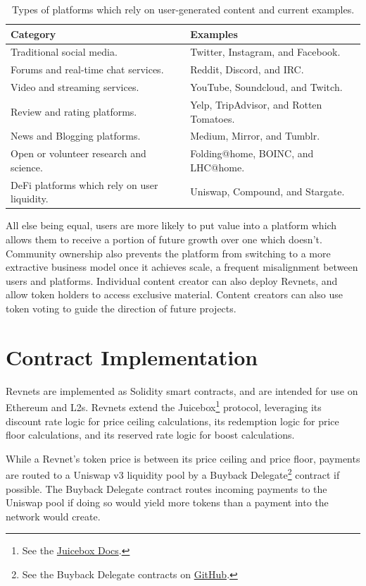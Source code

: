 \documentclass{article}
\begin{document}
\begin{table}[h]
  \centering
  \begin{tabular}{|l|l|}
    \hline \textbf{Category} & \textbf{Examples} \\
    \hline Traditional social media. & Twitter, Instagram, and Facebook. \\
    \hline Forums and real-time chat services. & Reddit, Discord, and IRC. \\
    \hline Video and streaming services. & YouTube, Soundcloud, and Twitch. \\
    \hline Review and rating platforms. & Yelp, TripAdvisor, and Rotten Tomatoes. \\
    \hline News and Blogging platforms. & Medium, Mirror, and Tumblr. \\
    \hline Open or volunteer research and science. & Folding@home, BOINC, and LHC@home. \\
    \hline DeFi platforms which rely on user liquidity. & Uniswap, Compound, and Stargate. \\
    \hline
  \end{tabular}
  \caption{Types of platforms which rely on user-generated content and current examples.}
\end{table}

All else being equal, users are more likely to put value into a platform which allows them to receive a portion of future growth over one which doesn't. Community ownership also prevents the platform from switching to a more extractive business model once it achieves scale, a frequent misalignment between users and platforms. Individual content creator can also deploy Revnets, and allow token holders to access exclusive material. Content creators can also use token voting to guide the direction of future projects.

\section{Contract Implementation}

Revnets are implemented as Solidity smart contracts, and are intended for use on Ethereum and L2s. Revnets extend the Juicebox\footnote{See the \href{https://docs.juicebox.money}{Juicebox Docs}.} protocol, leveraging its discount rate logic for price ceiling calculations, its redemption logic for price floor calculations, and its reserved rate logic for boost calculations.

While a Revnet's token price is between its price ceiling and price floor, payments are routed to a Uniswap v3 liquidity pool by a Buyback Delegate\footnote{See the Buyback Delegate contracts on \href{https://github.com/jbx-protocol/juice-buyback}{GitHub}.} contract if possible. The Buyback Delegate contract routes incoming payments to the Uniswap pool if doing so would yield more tokens than a payment into the network would create.
\end{document}

